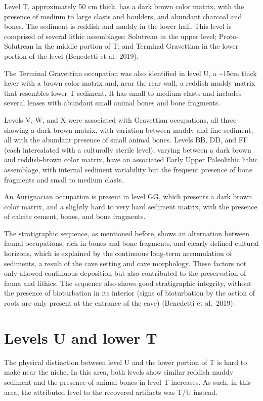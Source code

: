\documentclass[12pt,twoside]{reedthesis}
\begin{document}
Level T, approximately 50 cm thick, has a dark brown color matrix, with the presence of medium to large clasts and boulders, and abundant charcoal and bones. The sediment is reddish and muddy in the lower half. This level is comprised of several lithic assemblages: Solutrean in the upper level; Proto-Solutrean in the middle portion of T; and Terminal Gravettian in the lower portion of the level (Benedetti et al.~2019).

The Terminal Gravettian occupation was also identified in level U, a \textasciitilde15cm thick layer with a brown color matrix and, near the rear wall, a reddish muddy matrix that resembles lower T sediment. It has small to medium clasts and includes several lenses with abundant small animal bones and bone fragments.

Levels V, W, and X were associated with Gravettian occupations, all three showing a dark brown matrix, with variation between muddy and fine sediment, all with the abundant presence of small animal bones.
Levels BB, DD, and FF (each intercalated with a culturally sterile level), varying between a dark brown and reddish-brown color matrix, have an associated Early Upper Paleolithic lithic assemblage, with internal sediment variability but the frequent presence of bone fragments and small to medium clasts.

An Aurignacian occupation is present in level GG, which presents a dark brown color matrix, and a slightly hard to very hard sediment matrix, with the presence of calcite cement, bones, and bone fragments.

The stratigraphic sequence, as mentioned before, shows an alternation between faunal occupations, rich in bones and bone fragments, and clearly defined cultural horizons, which is explained by the continuous long-term accumulation of sediments, a result of the cave setting and cave morphology. These factors not only allowed continuous deposition but also contributed to the preservation of fauna and lithics. The sequence also shows good stratigraphic integrity, without the presence of bioturbation in its interior (signs of bioturbation by the action of roots are only present at the entrance of the cave) (Benedetti et al.~2019).

\hypertarget{levels-u-and-lower-t}{%
\section{Levels U and lower T}\label{levels-u-and-lower-t}}

The physical distinction between level U and the lower portion of T is hard to make near the niche. In this area, both levels show similar reddish muddy sediment and the presence of animal bones in level T increases. As such, in this area, the attributed level to the recovered artifacts was T/U instead.
\end{document}
